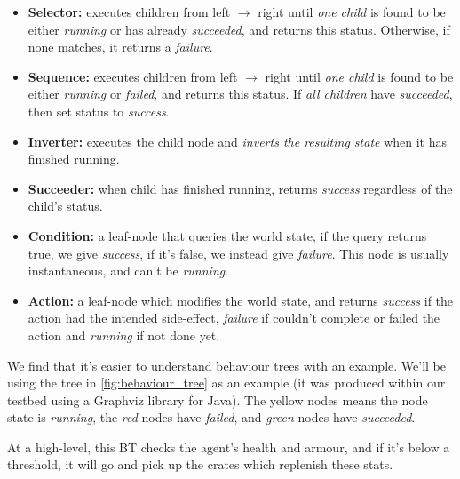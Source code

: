 \documentclass[a4paper, twocolumn]{article}
\begin{document}
        \begin{itemize}
            \item{\textbf{Selector:} executes children from left \(\rightarrow\) right until \emph{one child} is found to be either \emph{running} or has already \emph{succeeded}, and returns this status. Otherwise, if none matches, it returns a \emph{failure}.}
            \item{\textbf{Sequence:} executes children from left \(\rightarrow\) right until \emph{one child} is found to be either \emph{running} or \emph{failed}, and returns this status. If \emph{all children} have \emph{succeeded}, then set status to \emph{success}.}
            \item{\textbf{Inverter:} executes the child node and \emph{inverts the resulting state} when it has finished running.}
            \item{\textbf{Succeeder:} when child has finished running, returns \emph{success} regardless of the child's status.}
            \item{\textbf{Condition:} a leaf-node that queries the world state, if the query returns true, we give \emph{success}, if it's false, we instead give \emph{failure}. This node is usually instantaneous, and can't be \emph{running}.}
            \item{\textbf{Action:} a leaf-node which modifies the world state, and returns \emph{success} if the action had the intended side-effect, \emph{failure} if couldn't complete or failed the action and \emph{running} if not done yet.}

        \end{itemize}

        We find that it's easier to understand behaviour trees with an example. We'll be using the tree in \cref{fig:behaviour_tree} as an example (it was produced within our testbed using a Graphviz library for Java). The yellow nodes means the node state is \emph{running}, the \emph{red} nodes have \emph{failed}, and \emph{green} nodes have \emph{succeeded}.

        At a high-level, this BT checks the agent's health and armour, and if it's below a threshold, it will go and pick up the crates which replenish these stats.
\end{document}
